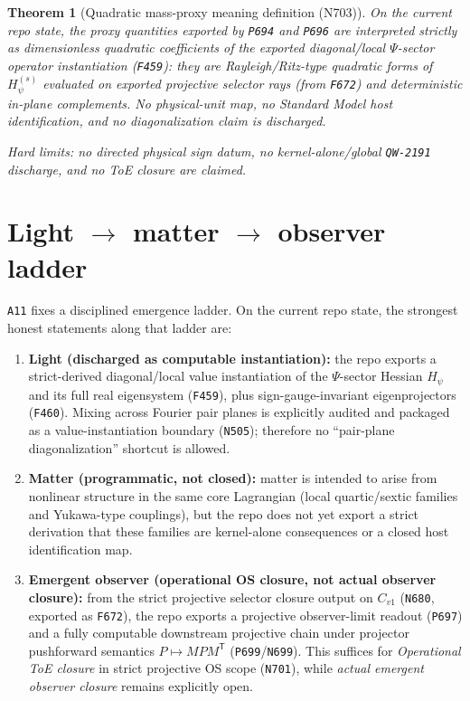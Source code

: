 \documentclass[11pt,a4paper]{article}
\newtheorem{theorem}{Theorem}[section]
\begin{document}
\begin{theorem}[Quadratic mass-proxy meaning definition (N703)]
On the current repo state, the proxy quantities exported by \texttt{P694} and \texttt{P696} are interpreted strictly as \emph{dimensionless quadratic coefficients}
of the exported diagonal/local $\Psi$-sector operator instantiation (\texttt{F459}):
they are Rayleigh/Ritz-type quadratic forms of $H_{\psi}^{(s)}$ evaluated on exported projective selector rays (from \texttt{F672}) and deterministic in-plane complements.
No physical-unit map, no Standard Model host identification, and no diagonalization claim is discharged.

\emph{Hard limits:} no directed physical sign datum, no kernel-alone/global \texttt{QW-2191} discharge, and no ToE closure are claimed.
\end{theorem}
\section{Light $\to$ matter $\to$ observer ladder}

\texttt{A11} fixes a disciplined emergence ladder. On the current repo state, the strongest honest statements along that ladder are:

\begin{enumerate}[label=\arabic*.]
  \item \textbf{Light (discharged as computable instantiation):}
  the repo exports a strict-derived diagonal/local value instantiation of the $\Psi$-sector Hessian $H_{\psi}$ and its full real eigensystem (\texttt{F459}),
  plus sign-gauge-invariant eigenprojectors (\texttt{F460}).
  Mixing across Fourier pair planes is explicitly audited and packaged as a value-instantiation boundary (\texttt{N505}); therefore no “pair-plane diagonalization” shortcut is allowed.

  \item \textbf{Matter (programmatic, not closed):}
  matter is intended to arise from nonlinear structure in the same core Lagrangian (local quartic/sextic families and Yukawa-type couplings),
  but the repo does not yet export a strict derivation that these families are kernel-alone consequences or a closed host identification map.

  \item \textbf{Emergent observer (operational OS closure, not actual observer closure):}
  from the strict projective selector closure output on $C_{v1}$ (\texttt{N680}, exported as \texttt{F672}), the repo exports a projective observer-limit readout (\texttt{P697})
  and a fully computable downstream projective chain under projector pushforward semantics $P\mapsto MPM^{\mathsf T}$ (\texttt{P699}/\texttt{N699}).
  This suffices for \emph{Operational ToE closure} in strict projective OS scope (\texttt{N701}), while \emph{actual emergent observer closure} remains explicitly open.
\end{enumerate}
\end{document}
